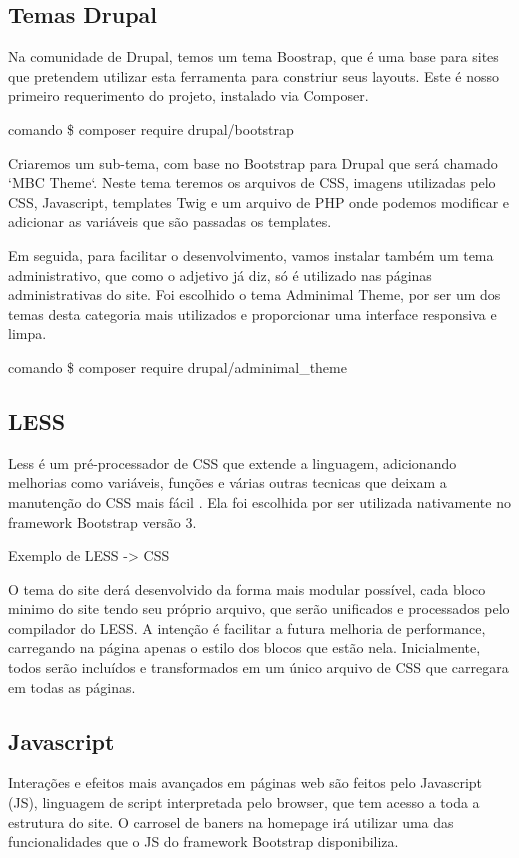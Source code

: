\subsection{Temas Drupal}
Na comunidade de Drupal, temos um tema Boostrap, que é uma base para sites que pretendem utilizar esta ferramenta para constriur seus layouts. Este é nosso primeiro requerimento do projeto, instalado via Composer.

\TODO comando \$ composer require drupal/bootstrap

Criaremos um sub-tema, com base no Bootstrap para Drupal que será chamado `MBC Theme`. Neste tema teremos os arquivos de CSS, imagens utilizadas pelo CSS, Javascript, templates Twig e um arquivo de PHP onde podemos modificar e adicionar as variáveis que são passadas os templates. 

Em seguida, para facilitar o desenvolvimento, vamos instalar também um tema administrativo, que como o adjetivo já diz, só é utilizado nas páginas administrativas do site. Foi escolhido o tema Adminimal Theme, por ser um dos temas desta categoria mais utilizados e proporcionar uma interface responsiva e limpa.

\TODO comando \$ composer require drupal/adminimal_theme

\subsection{LESS}
Less é um pré-processador de CSS que extende a linguagem, adicionando melhorias como variáveis, funções e várias outras tecnicas que deixam a manutenção do CSS mais fácil \cite{Less}. Ela foi escolhida por ser utilizada nativamente no framework Bootstrap versão 3.

\TODO Exemplo de LESS -> CSS

O tema do site derá desenvolvido da forma mais modular possível, cada bloco minimo do site tendo seu próprio arquivo, que serão unificados e processados pelo compilador do LESS. A intenção é facilitar a futura melhoria de performance, carregando na página apenas o estilo dos blocos que estão nela. Inicialmente, todos serão incluídos e transformados em um único arquivo de CSS que carregara em todas as páginas.

\subsection{Javascript}
Interações e efeitos mais avançados em páginas web são feitos pelo Javascript (JS), linguagem de script interpretada pelo browser, que tem acesso a toda a estrutura do site. O carrosel de baners na homepage irá utilizar uma das funcionalidades que o JS do framework Bootstrap disponibiliza.

